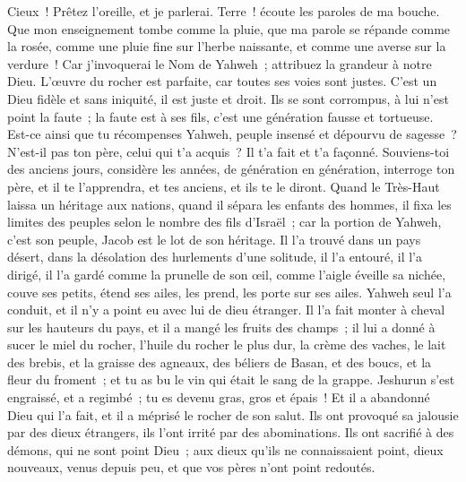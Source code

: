 \begin{multicols}{2}
\VerseOne{}Cieux~! Prêtez l'oreille, et je parlerai. Terre~! écoute les paroles de ma bouche.
Que mon enseignement tombe comme la pluie, que ma parole se répande comme la rosée, comme une pluie fine sur l'herbe naissante, et comme une averse sur la verdure~!
Car j'invoquerai le Nom de Yahweh~; attribuez la grandeur à notre Dieu.
L'œuvre du rocher est parfaite, car toutes ses voies sont justes. C'est un Dieu fidèle et sans iniquité, il est juste et droit.
Ils se sont corrompus, à lui n'est point la faute~; la faute est à ses fils, c'est une génération fausse et tortueuse.
Est-ce ainsi que tu récompenses Yahweh, peuple insensé et dépourvu de sagesse~? N'est-il pas ton père, celui qui t'a acquis~? Il t'a fait et t'a façonné.
Souviens-toi des anciens jours, considère les années, de génération en génération, interroge ton père, et il te l'apprendra, et tes anciens, et ils te le diront.
Quand le Très-Haut laissa un héritage aux nations, quand il sépara les enfants des hommes, il fixa les limites des peuples selon le nombre des fils d'Israël~;
car la portion de Yahweh, c'est son peuple, Jacob est le lot de son héritage.
Il l'a trouvé dans un pays désert, dans la désolation des hurlements d'une solitude, il l'a entouré, il l'a dirigé, il l'a gardé comme la prunelle de son œil,
comme l'aigle éveille sa nichée, couve ses petits, étend ses ailes, les prend, les porte sur ses ailes.
Yahweh seul l'a conduit, et il n'y a point eu avec lui de dieu étranger.
Il l'a fait monter à cheval sur les hauteurs du pays, et il a mangé les fruits des champs~; il lui a donné à sucer le miel du rocher, l'huile du rocher le plus dur,
la crème des vaches, le lait des brebis, et la graisse des agneaux, des béliers de Basan, et des boucs, et la fleur du froment~; et tu as bu le vin qui était le sang de la grappe.
Jeshurun s'est engraissé, et a regimbé~; tu es devenu gras, gros et épais~! Et il a abandonné Dieu qui l'a fait, et il a méprisé le rocher de son salut.
Ils ont provoqué sa jalousie par des dieux étrangers, ils l'ont irrité par des abominations.
Ils ont sacrifié à des démons, qui ne sont point Dieu~; aux dieux qu'ils ne connaissaient point, dieux nouveaux, venus depuis peu, et que vos pères n'ont point redoutés.

\end{multicols}
